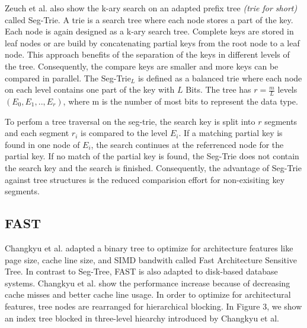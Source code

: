 \documentclass[conference]{IEEEtran}
\begin{document}
Zeuch et al. also show the k-ary search on an adapted prefix tree \emph{(trie for short)} called Seg-Trie. A trie is a search tree where each node stores a part of the key. Each node is again designed as a k-ary search tree. Complete keys are stored in leaf nodes or are build by concatenating partial keys from the root node to a leaf node. This approach benefits of the separation of the keys in different levels of the tree. Consequently, the compare keys are smaller and more keys can be compared in parallel. The Seg-Trie$_L$ is defined as a balanced trie where each node on each level contains one part of the key with $L$ Bits. The tree has $r = \frac{m}{L}$ levels $(E_0, E_1, .., E_r)$, where m is the number of most bits to represent the data type.

To perfom a tree traversal on the seg-trie, the search key is split into $r$ segments and each segment $r_i$ is compared to the level $E_i$. If a matching partial key is found in one node of $E_i$, the search continues at the referrenced node for the partial key. If no match of the partial key is found, the Seg-Trie does not contain the search key and the search is finished. Consequently, the advantage of Seg-Trie against tree structures is the reduced comparision effort for non-exisiting key segments. 


\subsection{FAST}\label{SCM}
Changkyu et al. adapted a binary tree to optimize for architecture features like page size, cache line size, and SIMD bandwith called Fast Architecture Sensitive Tree. In contrast to Seg-Tree, FAST is also adapted to disk-based database systems. Changkyu et al. show the performance increase because of decreasing cache misses and better cache line usage. In order to optimize for architectural features, tree nodes are rearranged for hierarchical blocking. In Figure 3, we show an index tree blocked in three-level hiearchy introduced by Changkyu et al. 
\end{document}
